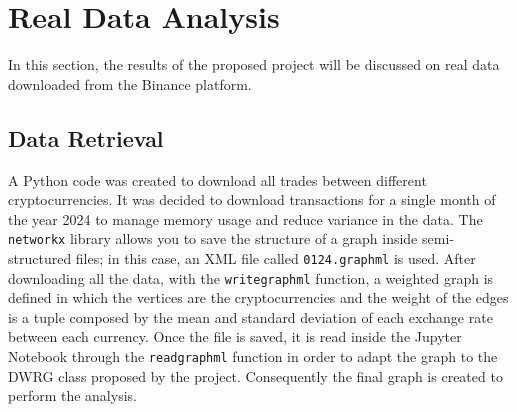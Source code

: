 \section{Real Data Analysis}\label{experiments}
In this section, the results of the proposed project will be discussed on real data downloaded from the Binance platform.
\subsection{Data Retrieval}
A Python code was created to download all trades between different cryptocurrencies. It was decided to download transactions for a single month of the year 2024 to manage memory usage and reduce variance in the data.
The \texttt{networkx} library allows you to save the structure of a graph inside semi-structured files; in this case, an XML file called \texttt{01\textunderscore 24.graphml} is used. 
After downloading all the data, with the \texttt{write\textunderscore graphml} function, a weighted graph is defined in which the vertices are the cryptocurrencies and the weight of the edges is a tuple composed by the mean and standard deviation of each exchange rate between each currency.
Once the file is saved, it is read inside the Jupyter Notebook through the \texttt{read\textunderscore graphml} function in order to adapt the graph to the DWRG class proposed by the project. Consequently the final graph is created to perform the analysis.
